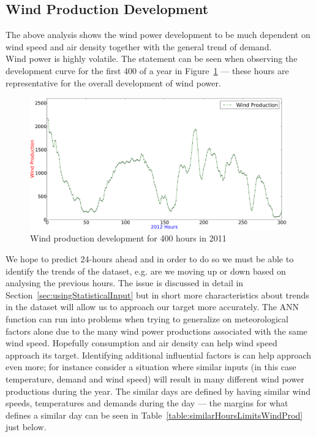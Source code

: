 \subsection{Wind Production Development}
\label{sec:windProductionDev}
The above analysis shows the wind power development to be much dependent on wind speed and air density together with the general trend of demand. 
\\[0.5cm]
Wind power is highly volatile. The statement can be seen when observing the development curve for the first 400 of a year in Figure~\ref{fig:windHourDevelopment400Hours} --- these hours are representative for the overall development of wind power. 

\begin{figure}[ht!]
\centering
\includegraphics[width=0.99\textwidth]{billeder/productionTendency400Hours.png}
\caption{Wind production development for 400 hours in 2011}
\label{fig:windHourDevelopment400Hours}
\end{figure}

\noindent We hope to predict 24-hours ahead and in order to do so we must be able to identify the trends of the dataset, e.g. are we moving up or down based on analysing the previous hours. The issue is discussed in detail in Section~\ref{sec:usingStatisticalInput} but in short more characteristics about trends in the dataset will allow us to approach our target more accurately. The ANN function can run into problems when trying to generalize on meteorological factors alone due to the many wind power productions associated with the same wind speed. Hopefully consumption and air density can help wind speed approach its target. Identifying additional influential factors is can help approach even more; for instance consider a situation where similar inputs (in this case temperature, demand and wind speed) will result in many different wind power productions during the year. The similar days are defined by having similar wind speeds, temperatures and demands during the day --- the margins for what defines a similar day can be seen in Table~\ref{table:similarHoursLimitsWindProd} just below.

